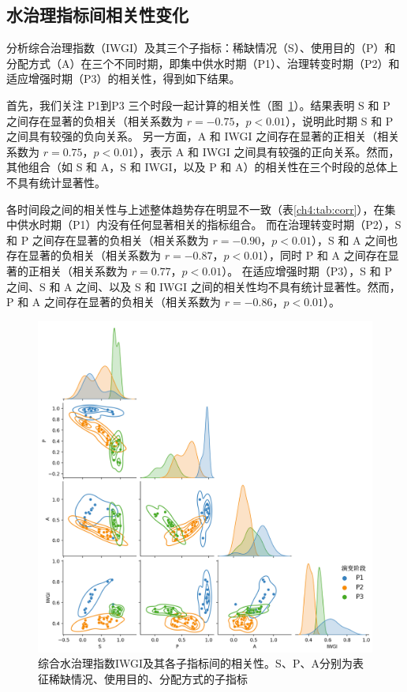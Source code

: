 
\subsection{水治理指标间相关性变化}

分析综合治理指数（IWGI）及其三个子指标：稀缺情况（S）、使用目的（P）和分配方式（A）在三个不同时期，即集中供水时期（P1）、治理转变时期（P2）和适应增强时期（P3）的相关性，得到如下结果。

首先，我们关注 P1到P3 三个时段一起计算的相关性（图~\ref{ch4:fig:corr}）。结果表明 S 和 P 之间存在显著的负相关（相关系数为 $r = -0.75$，$p < 0.01$），说明此时期 S 和 P 之间具有较强的负向关系。
另一方面，A 和 IWGI 之间存在显著的正相关（相关系数为 $r = 0.75$，$p < 0.01$），表示 A 和 IWGI 之间具有较强的正向关系。然而，其他组合（如 S 和 A，S 和 IWGI，以及 P 和 A）的相关性在三个时段的总体上不具有统计显著性。

各时间段之间的相关性与上述整体趋势存在明显不一致（表\ref{ch4:tab:corr}），在集中供水时期（P1）内没有任何显著相关的指标组合。
而在治理转变时期（P2），S 和 P 之间存在显著的负相关（相关系数为 $r = -0.90$，$p < 0.01$），S 和 A 之间也存在显著的负相关（相关系数为 $r = -0.87$，$p < 0.01$），同时 P 和 A 之间存在显著的正相关（相关系数为 $r = 0.77$，$p < 0.01$）。
在适应增强时期（P3），S 和 P 之间、S 和 A 之间、以及 S 和 IWGI 之间的相关性均不具有统计显著性。然而，P 和 A 之间存在显著的负相关（相关系数为 $r = -0.86$，$p < 0.01$）。

\begin{figure}[!ht]
    \centering
    \includegraphics[width=\textwidth]{img/ch4/ch4_correlation.png}
    \caption[综合水治理指数IWGI及其各子指标间的相关性]{综合水治理指数IWGI及其各子指标间的相关性。S、P、A分别为表征稀缺情况、使用目的、分配方式的子指标}\label{ch4:fig:corr}
\end{figure}

